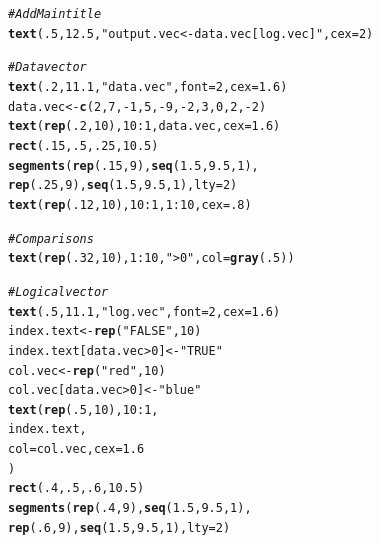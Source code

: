 \documentclass{tufte-book}\usepackage[]{graphicx}\usepackage[]{color}
\makeatletter
\newcommand{\hlnum}[1]{\textcolor[rgb]{0.686,0.059,0.569}{#1}}%
\newcommand{\hlstr}[1]{\textcolor[rgb]{0.192,0.494,0.8}{#1}}%
\newcommand{\hlcom}[1]{\textcolor[rgb]{0.678,0.584,0.686}{\textit{#1}}}%
\newcommand{\hlopt}[1]{\textcolor[rgb]{0,0,0}{#1}}%
\newcommand{\hlstd}[1]{\textcolor[rgb]{0.345,0.345,0.345}{#1}}%
\newcommand{\hlkwb}[1]{\textcolor[rgb]{0.69,0.353,0.396}{#1}}%
\newcommand{\hlkwc}[1]{\textcolor[rgb]{0.333,0.667,0.333}{#1}}%
\newcommand{\hlkwd}[1]{\textcolor[rgb]{0.737,0.353,0.396}{\textbf{#1}}}%
\newenvironment{kframe}{%
 \def\at@end@of@kframe{}%
 \ifinner\ifhmode%
  \def\at@end@of@kframe{\end{minipage}}%
  \begin{minipage}{\columnwidth}%
 \fi\fi%
 \def\FrameCommand##1{\hskip\@totalleftmargin \hskip-\fboxsep
 \colorbox{shadecolor}{##1}\hskip-\fboxsep
     \hskip-\linewidth \hskip-\@totalleftmargin \hskip\columnwidth}%
 \MakeFramed {\advance\hsize-\width
   \@totalleftmargin\z@ \linewidth\hsize
   \@setminipage}}%
 {\par\unskip\endMakeFramed%
 \at@end@of@kframe}
\newenvironment{knitrout}{}{} %
\makeatother
\begin{document}
\begin{footnotesize}
\begin{marginfigure}
\begin{tiny}
\begin{knitrout}
\begin{kframe}
\begin{alltt}
\hlcom{# Add Main title}
\hlkwd{text}\hlstd{(}\hlnum{.5}\hlstd{,} \hlnum{12.5}\hlstd{,} \hlstr{"output.vec <- data.vec[log.vec]"}\hlstd{,} \hlkwc{cex} \hlstd{=} \hlnum{2}\hlstd{)}

\hlcom{# Data vector}
\hlkwd{text}\hlstd{(}\hlnum{.2}\hlstd{,} \hlnum{11.1}\hlstd{,} \hlstr{"data.vec"}\hlstd{,} \hlkwc{font} \hlstd{=} \hlnum{2}\hlstd{,} \hlkwc{cex} \hlstd{=} \hlnum{1.6}\hlstd{)}
\hlstd{data.vec} \hlkwb{<-} \hlkwd{c}\hlstd{(}\hlnum{2}\hlstd{,} \hlnum{7}\hlstd{,} \hlopt{-}\hlnum{1}\hlstd{,} \hlnum{5}\hlstd{,} \hlopt{-}\hlnum{9}\hlstd{,} \hlopt{-}\hlnum{2}\hlstd{,} \hlnum{3}\hlstd{,} \hlnum{0}\hlstd{,} \hlnum{2}\hlstd{,} \hlopt{-}\hlnum{2}\hlstd{)}
\hlkwd{text}\hlstd{(}\hlkwd{rep}\hlstd{(}\hlnum{.2}\hlstd{,} \hlnum{10}\hlstd{),} \hlnum{10}\hlopt{:}\hlnum{1}\hlstd{, data.vec,} \hlkwc{cex} \hlstd{=} \hlnum{1.6}\hlstd{)}
\hlkwd{rect}\hlstd{(}\hlnum{.15}\hlstd{,} \hlnum{.5}\hlstd{,} \hlnum{.25}\hlstd{,} \hlnum{10.5}\hlstd{)}
\hlkwd{segments}\hlstd{(}\hlkwd{rep}\hlstd{(}\hlnum{.15}\hlstd{,} \hlnum{9}\hlstd{),} \hlkwd{seq}\hlstd{(}\hlnum{1.5}\hlstd{,} \hlnum{9.5}\hlstd{,} \hlnum{1}\hlstd{),}
         \hlkwd{rep}\hlstd{(}\hlnum{.25}\hlstd{,} \hlnum{9}\hlstd{),} \hlkwd{seq}\hlstd{(}\hlnum{1.5}\hlstd{,} \hlnum{9.5}\hlstd{,} \hlnum{1}\hlstd{),} \hlkwc{lty} \hlstd{=} \hlnum{2}\hlstd{)}
\hlkwd{text}\hlstd{(}\hlkwd{rep}\hlstd{(}\hlnum{.12}\hlstd{,} \hlnum{10}\hlstd{),} \hlnum{10}\hlopt{:}\hlnum{1}\hlstd{,} \hlnum{1}\hlopt{:}\hlnum{10}\hlstd{,} \hlkwc{cex} \hlstd{=} \hlnum{.8}\hlstd{)}

\hlcom{# Comparisons}
\hlkwd{text}\hlstd{(}\hlkwd{rep}\hlstd{(}\hlnum{.32}\hlstd{,} \hlnum{10}\hlstd{),} \hlnum{1}\hlopt{:}\hlnum{10}\hlstd{,} \hlstr{"> 0"}\hlstd{,} \hlkwc{col} \hlstd{=} \hlkwd{gray}\hlstd{(}\hlnum{.5}\hlstd{))}

\hlcom{# Logical vector}
\hlkwd{text}\hlstd{(}\hlnum{.5}\hlstd{,} \hlnum{11.1}\hlstd{,} \hlstr{"log.vec"}\hlstd{,} \hlkwc{font} \hlstd{=} \hlnum{2}\hlstd{,} \hlkwc{cex} \hlstd{=} \hlnum{1.6}\hlstd{)}
\hlstd{index.text} \hlkwb{<-} \hlkwd{rep}\hlstd{(}\hlstr{"FALSE"}\hlstd{,} \hlnum{10}\hlstd{)}
\hlstd{index.text[data.vec} \hlopt{>} \hlnum{0}\hlstd{]} \hlkwb{<-} \hlstr{"TRUE"}
\hlstd{col.vec} \hlkwb{<-} \hlkwd{rep}\hlstd{(}\hlstr{"red"}\hlstd{,} \hlnum{10}\hlstd{)}
\hlstd{col.vec[data.vec} \hlopt{>} \hlnum{0}\hlstd{]} \hlkwb{<-} \hlstr{"blue"}
\hlkwd{text}\hlstd{(}\hlkwd{rep}\hlstd{(}\hlnum{.5}\hlstd{,} \hlnum{10}\hlstd{),} \hlnum{10}\hlopt{:}\hlnum{1}\hlstd{,}
     \hlstd{index.text,}
     \hlkwc{col} \hlstd{= col.vec,} \hlkwc{cex} \hlstd{=} \hlnum{1.6}
     \hlstd{)}
\hlkwd{rect}\hlstd{(}\hlnum{.4}\hlstd{,} \hlnum{.5}\hlstd{,} \hlnum{.6}\hlstd{,} \hlnum{10.5}\hlstd{)}
\hlkwd{segments}\hlstd{(}\hlkwd{rep}\hlstd{(}\hlnum{.4}\hlstd{,} \hlnum{9}\hlstd{),} \hlkwd{seq}\hlstd{(}\hlnum{1.5}\hlstd{,} \hlnum{9.5}\hlstd{,} \hlnum{1}\hlstd{),}
         \hlkwd{rep}\hlstd{(}\hlnum{.6}\hlstd{,} \hlnum{9}\hlstd{),} \hlkwd{seq}\hlstd{(}\hlnum{1.5}\hlstd{,} \hlnum{9.5}\hlstd{,} \hlnum{1}\hlstd{),} \hlkwc{lty} \hlstd{=} \hlnum{2}\hlstd{)}


\end{alltt}
\end{kframe}
\end{knitrout}
\end{tiny}
\end{marginfigure}
\end{footnotesize}
\end{document}
